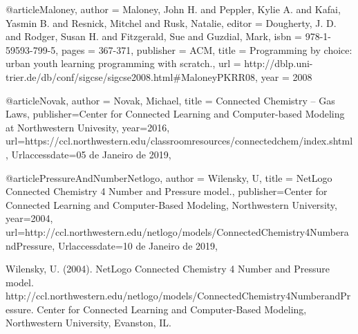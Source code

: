 

@article{Maloney,
  author = {Maloney, John H. and Peppler, Kylie A. and Kafai, Yasmin B. and Resnick, Mitchel and Rusk, Natalie},
  editor = {Dougherty, J. D. and Rodger, Susan H. and Fitzgerald, Sue and Guzdial, Mark},
  isbn = {978-1-59593-799-5},
  pages = {367-371},
  publisher = {ACM},
  title = {Programming by choice: urban youth learning programming with scratch.},
  url = {http://dblp.uni-trier.de/db/conf/sigcse/sigcse2008.html#MaloneyPKRR08},
  year = 2008
}

@article{Novak,
	author = {Novak, Michael}, 
	title = {Connected Chemistry – Gas Laws},
	publisher={Center for Connected Learning and Computer-based Modeling at Northwestern Univesity},
	year={2016},
	url={https://ccl.northwestern.edu/classroomresources/connectedchem/index.shtml},
	Urlaccessdate={05 de Janeiro de 2019},
}

@article{PressureAndNumberNetlogo,
	author = {Wilensky, U}, 
	title = {{NetLogo Connected Chemistry 4 Number and Pressure model.}},
	publisher={Center for Connected Learning and Computer-Based Modeling, Northwestern University},
	year={2004},
	url={http://ccl.northwestern.edu/netlogo/models/ConnectedChemistry4NumberandPressure},
	Urlaccessdate={10 de Janeiro de 2019},
}

Wilensky, U. (2004). NetLogo Connected Chemistry 4 Number and Pressure model. http://ccl.northwestern.edu/netlogo/models/ConnectedChemistry4NumberandPressure. Center for Connected Learning and Computer-Based Modeling, Northwestern University, Evanston, IL.



